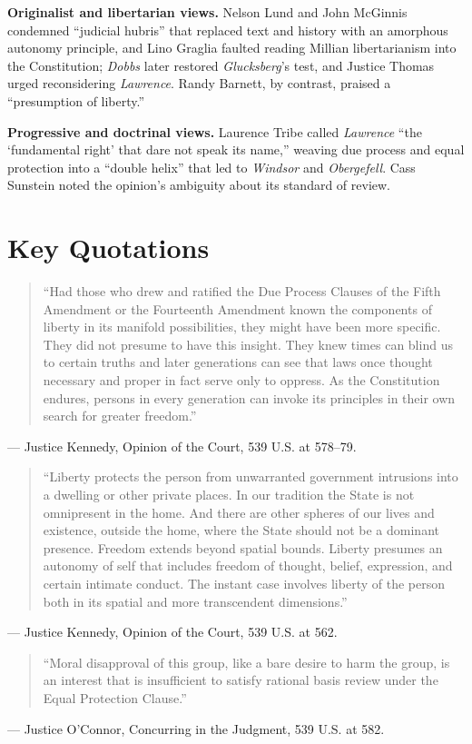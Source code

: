 \documentclass[12pt]{article}
\begin{document}
\textbf{Originalist and libertarian views.} Nelson Lund and John McGinnis condemned ``judicial hubris'' that replaced text and history with an amorphous autonomy principle, and Lino Graglia faulted reading Millian libertarianism into the Constitution; \textit{Dobbs} later restored \textit{Glucksberg}'s test, and Justice Thomas urged reconsidering \textit{Lawrence}. Randy Barnett, by contrast, praised a ``presumption of liberty.''

\textbf{Progressive and doctrinal views.} Laurence Tribe called \textit{Lawrence} ``the `fundamental right' that dare not speak its name,'' weaving due process and equal protection into a ``double helix'' that led to \textit{Windsor} and \textit{Obergefell}. Cass Sunstein noted the opinion's ambiguity about its standard of review.

\section{Key Quotations}

\begin{quote}
``Had those who drew and ratified the Due Process Clauses of the Fifth Amendment or the Fourteenth Amendment known the components of liberty in its manifold possibilities, they might have been more specific. They did not presume to have this insight. They knew times can blind us to certain truths and later generations can see that laws once thought necessary and proper in fact serve only to oppress. As the Constitution endures, persons in every generation can invoke its principles in their own search for greater freedom.''
\end{quote}
\noindent --- Justice Kennedy, Opinion of the Court, 539 U.S. at 578--79.

\begin{quote}
``Liberty protects the person from unwarranted government intrusions into a dwelling or other private places. In our tradition the State is not omnipresent in the home. And there are other spheres of our lives and existence, outside the home, where the State should not be a dominant presence. Freedom extends beyond spatial bounds. Liberty presumes an autonomy of self that includes freedom of thought, belief, expression, and certain intimate conduct. The instant case involves liberty of the person both in its spatial and more transcendent dimensions.''
\end{quote}
\noindent --- Justice Kennedy, Opinion of the Court, 539 U.S. at 562.

\begin{quote}
``Moral disapproval of this group, like a bare desire to harm the group, is an interest that is insufficient to satisfy rational basis review under the Equal Protection Clause.''
\end{quote}
\noindent --- Justice O'Connor, Concurring in the Judgment, 539 U.S. at 582.
\end{document}
